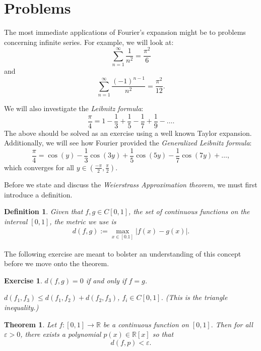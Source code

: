 \documentclass{article}
\newtheorem{thm}{Theorem}[section]
\newtheorem{defn}{Definition}[section]
\newtheorem{exer}{Exercise}[section]
\begin{document}
\section{Problems}

The most immediate applications of Fourier's expansion might be to problems concerning infinite series. For example, we will look at:
\begin{equation}
\sum_{n=1}^{\infty} \frac{1}{n^2} = \frac{\pi^2}{6}
\end{equation}
and
\begin{equation}
\sum_{n=1}^{\infty} \frac{(-1)^{n-1}}{n^2} = \frac{\pi^2}{12}.
\end{equation}

We will also investigate the \textit{Leibnitz formula}:
\begin{equation}
\frac{\pi}{4} = 1 - \frac{1}{3} + \frac{1}{5} - \frac{1}{7} + \frac{1}{9} - \ldots
.\end{equation}
The above should be solved as an exercise using a well known Taylor expansion. Additionally, we will see how Fourier provided the \textit{Generalized Leibnitz formula}:
\begin{equation}
\frac{\pi}{4} = \cos(y) - \frac{1}{3}\cos(3y) + \frac{1}{5}\cos(5y) - \frac{1}{7}\cos(7y) + \ldots,
\end{equation}
which converges for all $y \in (\frac{-\pi}{2}, \frac{\pi}{2}).$

Before we state and discuss the \textit{Weierstrass Approximation theorem}, we must first introduce a definition.
\begin{defn} Given that $f,g \in C[0,1]$, the set of continuous functions on the interval $[0,1]$, the metric we use is 
\begin{align}
    d(f,g) := \max_{x \in [0.1]} \vert f(x) - g(x) \vert .
\end{align}
\end{defn}

The following exercise are meant to bolster an understanding of this concept before we move onto the theorem. 

\begin{exer}

$d(f,g) = 0$ if and only if $f=g$.

$d(f_{1}, f_{3}) \leq d(f_{1}, f_{2}) + d(f_{2}, f_{3})$, $f_{i} \in C[0,1]$. (This is the \textit{triangle inequality}.)

\end{exer}

\begin{thm}
Let $f : [0,1] \to \mathbb{R}$ be a continuous function on $[0,1].$ Then for all $\varepsilon > 0$, there exists a polynomial $p(x) \in \mathbb{R}[x]$ so that 
$$
d(f,p) < \varepsilon.
$$
\end{thm}
\end{document}
